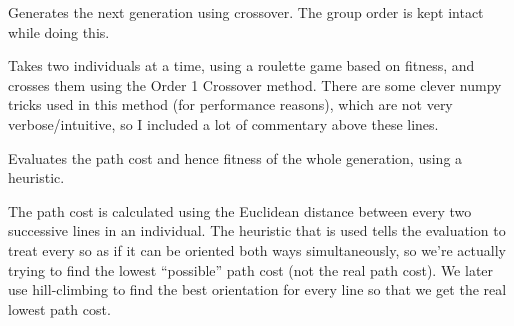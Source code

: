 \documentclass[letterpaper,10pt,english,openany,oneside]{sphinxmanual}
\begin{document}
\begin{fulllineitems}
\begin{fulllineitems}
\begin{quote}
\begin{description}
\begin{description}
\end{description}

\end{description}\end{quote}

\end{fulllineitems}


\begin{fulllineitems}
\label{\detokenize{reference:cnc.optimization.CNCOptimizer.crossover}}
Generates the next generation using crossover. The group order is kept
intact while doing this.

Takes two individuals at a time, using a roulette game based on
fitness, and crosses them using the Order 1 Crossover method. There are
some clever numpy tricks used in this method (for performance reasons),
which are not very verbose/intuitive, so I included a lot of commentary
above these lines.

\end{fulllineitems}


\begin{fulllineitems}
\label{\detokenize{reference:cnc.optimization.CNCOptimizer.evaluate_generation}}
Evaluates the path cost and hence fitness of the whole generation,
using a heuristic.

The path cost is calculated using the Euclidean distance between every
two successive lines in an individual. The heuristic that is used tells
the evaluation to treat every so as if it can be oriented both ways
simultaneously, so we’re actually trying to find the lowest “possible”
path cost (not the real path cost). We later use hill-climbing to find
the best orientation for every line so that we get the real lowest path
cost.

\end{fulllineitems}



\end{fulllineitems}
\end{document}
